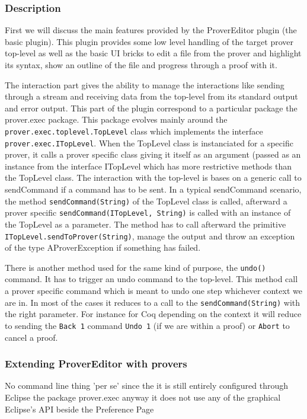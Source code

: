 \documentclass{entcs}
\begin{document}
\subsubsection{Description}
First we will discuss the main features provided by the ProverEditor plugin
(the basic plugin). This plugin provides some low level handling of the target
prover top-level as well as the basic UI bricks to edit a file from the 
prover and highlight its syntax, show an outline of the file and
progress through a proof with it.

The interaction part gives the ability to manage the interactions like sending
through a stream and receiving data from the top-level from its standard output
and error output.
This part of the plugin correspond to a particular package the 
prover.exec package.
This package evolves mainly around the \\
{\tt prover.exec.toplevel.TopLevel} class
which implements the interface {\tt prover.exec.ITopLevel}. 
When the TopLevel class
is instanciated for a specific prover, it calls a prover specific class giving 
it itself as an argument (passed as an instance from the interface
ITopLevel which has more restrictive methods than the TopLevel class.
The interaction with the top-level is bases on a generic call to sendCommand
if a command has to be sent. In a typical sendCommand scenario, the method
{\tt sendCommand(String)} of the TopLevel class is called, 
afterward a prover specific 
{\tt sendCommand(ITopLevel, String)} is called with an instance of the 
TopLevel as a parameter. The method has to call afterward the primitive
{\tt ITopLevel.sendToProver(String)}, manage the output and throw an 
exception of the type AProverException if something has failed.

There is another method used for the same kind of purpose, the
{\tt undo()} command. It has to trigger an undo command to the
top-level. This method call a prover specific  command
which is meant to undo one step whichever context we are in. In most of
the cases it reduces to a call to the {\tt sendCommand(String)} with the 
right parameter.
For instance for Coq depending on the context it will  reduce to 
sending the {\tt Back 1} command {\tt Undo 1}
 (if we are within a proof) or {\tt Abort}
to cancel a proof.\\


\subsubsection{Extending ProverEditor with provers}
No command line thing 'per se' since
the it is still entirely configured through Eclipse
the package prover.exec anyway it does not use any of the graphical 
Eclipse's API beside the Preference Page
\end{document}
